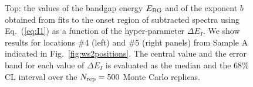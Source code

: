 \begin{figure}[t]
\begin{centering}
  \caption{Top: the values of the bandgap energy $E_{\rm BG}$ and of the exponent $b$
  obtained from fits to the onset
  region of subtracted spectra using Eq.~(\ref{eq:I1}) as a function
  of the hyper-parameter $\Delta E_I$.
  We show results for locations \#4 (left)
  and \#5 (right panels) from Sample A indicated in Fig.~\ref{fig:ws2positions}.
  The central value and the error band for each value of $\Delta E_I$ is evaluated
  as the median and the 68\% CL interval over the $N_{\rm rep}=500$ Monte Carlo replicas.
  }
\label{fig:bvalues}
\end{centering}
\end{figure}





